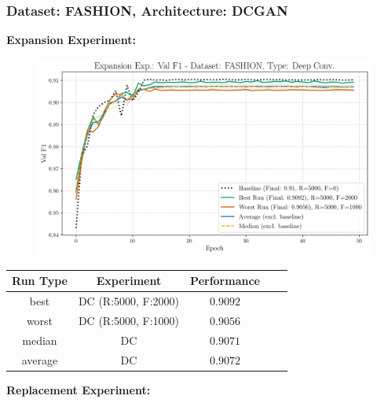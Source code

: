 \subsubsection{Dataset: FASHION, Architecture: DCGAN}
\noindent\textbf{Expansion Experiment:}
\begin{figure}[htbp]
	\centering
	\includegraphics[width=.85\textwidth]{abb/strat_classifier_performance/FASHION_STRATIFIED_CLASSIFIERS_VANILLA_GAN/expansion_experiments/val_f1_score_['VANILLA']_FASHION_all.png}
	\label{fig:app_strat_class_performance_expansion_exp._val_f1_score_}
\end{figure}
\begin{table}[H]
	\centering
	\vspace{-1em}
	\begin{tabular}{|c|c|c|c|c|}
		\hline
		Run Type & Experiment & Performance \\ \hline
		best & DC (R:5000, F:2000) & $0.9092$\\ \hline
		worst & DC (R:5000, F:1000) & $0.9056$\\ \hline
		median & DC & $0.9071$\\ \hline
		average & DC & $0.9072$
		\\ \hline
	\end{tabular}
\end{table}
\noindent\textbf{Replacement Experiment:}
